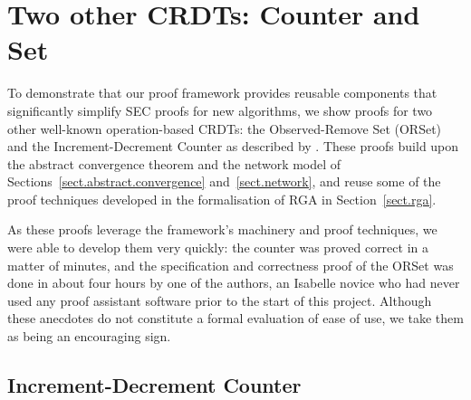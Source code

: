 \section{Two other CRDTs: Counter and Set}
\label{sect.simple.crdts}

To demonstrate that our proof framework provides reusable components that significantly simplify SEC proofs for new algorithms, we show proofs for two other well-known operation-based CRDTs: the Observed-Remove Set (ORSet) and the Increment-Decrement Counter as described by \citet{Shapiro:2011wy}.
These proofs build upon the abstract convergence theorem and the network model of Sections~\ref{sect.abstract.convergence} and~\ref{sect.network}, and reuse some of the proof techniques developed in the formalisation of RGA in Section~\ref{sect.rga}.

As these proofs leverage the framework's machinery and proof techniques, we were able to develop them very quickly: the counter was proved correct in a matter of minutes, and the specification and correctness proof of the ORSet was done in about four hours by one of the authors, an Isabelle novice who had never used any proof assistant software prior to the start of this project.
Although these anecdotes do not constitute a formal evaluation of ease of use, we take them as being an encouraging sign.

\subsection{Increment-Decrement Counter}
\label{subsect.increment-decrement.counter}

